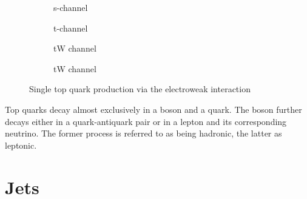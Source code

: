 \begin{figure}[H]
    \centering
    \begin{subfigure}[t]{0.2\textwidth}
        \centering
        
        \caption{s-channel}
        \label{fig:top_single_s}
    \end{subfigure}\hfill
    \begin{subfigure}[t]{0.2\textwidth}
        \centering
        
        \caption{t-channel}
        \label{fig:top_single_t}
    \end{subfigure}\hfill
    \begin{subfigure}[t]{0.2\textwidth}
        \centering
        
        \caption{tW channel}
        \label{fig:top_single_tw_1}
    \end{subfigure}\hfill
    \begin{subfigure}[t]{0.2\textwidth}
        \centering
        
        \caption{tW channel}
        \label{fig:top_single_tw_2}
    \end{subfigure}
    \caption{Single top quark production via the electroweak interaction}
    \label{fig:top_single}
\end{figure}
Top quarks decay almost exclusively in a \PWplus boson and a \Pbottom quark. The boson further decays either in a quark-antiquark pair or in a lepton and its corresponding neutrino. The former process is referred to as being hadronic, the latter as leptonic.

\section{Jets}